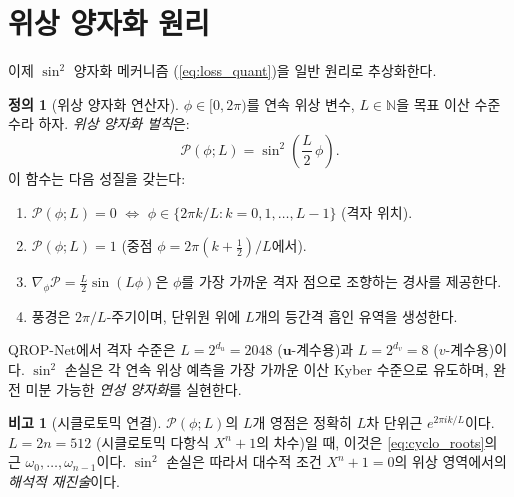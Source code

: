 \documentclass[11pt, a4paper]{article}
\theoremstyle{definition}
\newtheorem{definition}{정의}[section]
\newtheorem{remark}{비고}[section]
\theoremstyle{plain}
\begin{document}
\section{위상 양자화 원리}
\label{sec:bridge}

이제 $\sin^2$ 양자화 메커니즘 (\cref{eq:loss_quant})을 일반 원리로 추상화한다.

\begin{definition}[위상 양자화 연산자]
\label{def:pqo}
$\phi \in [0, 2\pi)$를 연속 위상 변수, $L \in \mathbb{N}$을 목표 이산 수준 수라 하자. \textit{위상 양자화 벌칙}은:
\begin{equation}
  \mathcal{P}(\phi; L) = \sin^2\!\left(\frac{L}{2}\,\phi\right).
  \label{eq:pqo}
\end{equation}
이 함수는 다음 성질을 갖는다:
\begin{enumerate}
  \item $\mathcal{P}(\phi; L) = 0$ $\iff$ $\phi \in \{2\pi k/L : k = 0, 1, \ldots, L-1\}$ (격자 위치).
  \item $\mathcal{P}(\phi; L) = 1$ (중점 $\phi = 2\pi(k + \tfrac{1}{2})/L$에서).
  \item $\nabla_\phi \mathcal{P} = \tfrac{L}{2}\sin(L\phi)$은 $\phi$를 가장 가까운 격자 점으로 조향하는 경사를 제공한다.
  \item 풍경은 $2\pi/L$-주기이며, 단위원 위에 $L$개의 등간격 흡인 유역을 생성한다.
\end{enumerate}
\end{definition}

QROP-Net에서 격자 수준은 $L = 2^{d_u} = 2048$ ($\mathbf{u}$-계수용)과 $L = 2^{d_v} = 8$ ($v$-계수용)이다. $\sin^2$ 손실은 각 연속 위상 예측을 가장 가까운 이산 Kyber 수준으로 유도하며, 완전 미분 가능한 \textit{연성 양자화}를 실현한다.

\begin{remark}[시클로토믹 연결]
\label{rem:cyclotomic}
$\mathcal{P}(\phi; L)$의 $L$개 영점은 정확히 $L$차 단위근 $e^{2\pi i k/L}$이다. $L = 2n = 512$ (시클로토믹 다항식 $X^n + 1$의 차수)일 때, 이것은 \cref{eq:cyclo_roots}의 근 $\omega_0, \ldots, \omega_{n-1}$이다. $\sin^2$ 손실은 따라서 대수적 조건 $X^n + 1 = 0$의 위상 영역에서의 \textit{해석적 재진술}이다.
\end{remark}
\end{document}
